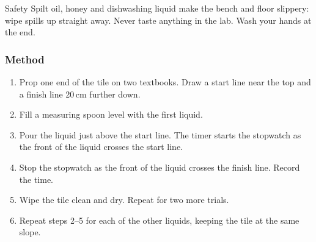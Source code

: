 \begin{center}
\end{center}

\begin{infobox}{Safety}
Spilt oil, honey and dishwashing liquid make the bench and floor slippery: wipe spills up straight away. Never taste anything in the lab. Wash your hands at the end.
\end{infobox}

\subsubsection*{Method}
\begin{enumerate}[itemsep=2pt]
  \item Prop one end of the tile on two textbooks. Draw a start line near the top and a finish line 20\,cm further down.
  \item Fill a measuring spoon level with the first liquid.
  \item Pour the liquid just above the start line. The timer starts the stopwatch as the front of the liquid crosses the start line.
  \item Stop the stopwatch as the front of the liquid crosses the finish line. Record the time.
  \item Wipe the tile clean and dry. Repeat for two more trials.
  \item Repeat steps 2--5 for each of the other liquids, keeping the tile at the same slope.
\end{enumerate}


